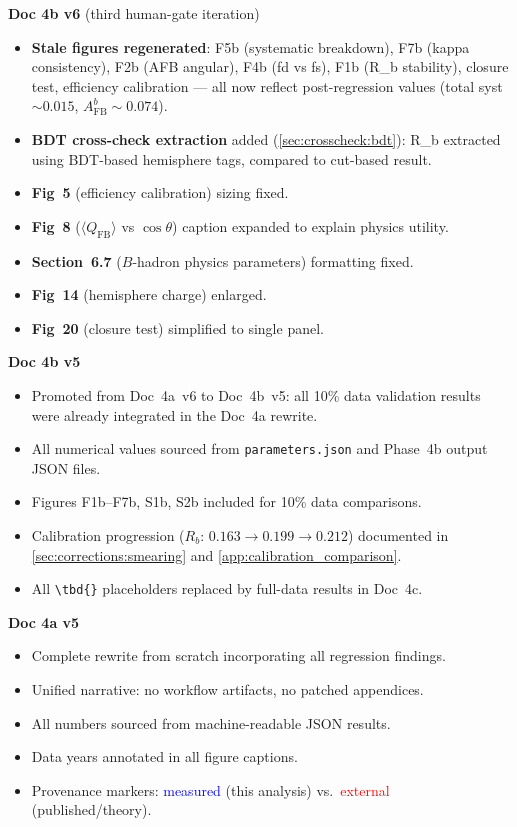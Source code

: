 \documentclass[11pt,a4paper]{article}
\newcommand{\tbd}[1]{\textcolor{gray}{\textit{#1}}}
\newcommand{\measured}[1]{\textcolor{blue}{#1}}
\newcommand{\external}[1]{\textcolor{red}{#1}}
\begin{document}
\textbf{Doc 4b v6} (third human-gate iteration)
\begin{itemize}
\item \textbf{Stale figures regenerated}: F5b (systematic breakdown),
  F7b (kappa consistency), F2b (AFB angular), F4b (fd vs fs), F1b (R\_b
  stability), closure test, efficiency calibration --- all now reflect
  post-regression values (total syst $\sim 0.015$, $A_\text{FB}^b \sim 0.074$).
\item \textbf{BDT cross-check extraction} added (\cref{sec:crosscheck:bdt}):
  R\_b extracted using BDT-based hemisphere tags, compared to cut-based result.
\item \textbf{Fig~5} (efficiency calibration) sizing fixed.
\item \textbf{Fig~8} ($\langle Q_\text{FB}\rangle$ vs $\cos\theta$) caption
  expanded to explain physics utility.
\item \textbf{Section~6.7} ($B$-hadron physics parameters) formatting fixed.
\item \textbf{Fig~14} (hemisphere charge) enlarged.
\item \textbf{Fig~20} (closure test) simplified to single panel.
\end{itemize}

\textbf{Doc 4b v5}
\begin{itemize}
\item Promoted from Doc~4a~v6 to Doc~4b~v5: all 10\% data validation
  results were already integrated in the Doc~4a rewrite.
\item All numerical values sourced from \texttt{parameters.json} and
  Phase~4b output JSON files.
\item Figures F1b--F7b, S1b, S2b included for 10\% data comparisons.
\item Calibration progression ($R_b$: $0.163 \to 0.199 \to 0.212$)
  documented in \cref{sec:corrections:smearing} and \cref{app:calibration_comparison}.
\item All \verb|\tbd{}| placeholders replaced by full-data results in Doc~4c.
\end{itemize}

\textbf{Doc 4a v5}
\begin{itemize}
\item Complete rewrite from scratch incorporating all regression findings.
\item Unified narrative: no workflow artifacts, no patched appendices.
\item All numbers sourced from machine-readable JSON results.
\item Data years annotated in all figure captions.
\item Provenance markers: \measured{measured} (this analysis) vs.\ \external{external} (published/theory).
\end{itemize}
\end{document}

